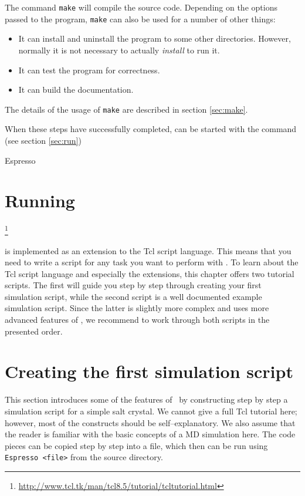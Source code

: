 The command \texttt{make} will compile the source code. Depending on
the options passed to the program, \texttt{make} can also be used for
a number of other things:
\begin{itemize}
\item It can install and uninstall the program to some other
  directories. However, normally it is not necessary to actually
  \textit{install} \es{} to run it.
\item It can test the \es{} program for correctness.
\item It can build the documentation.
\end{itemize}
The details of the usage of \texttt{make} are described in section
\vref{sec:make}.

When these steps have successfully completed, \es{} can be started
with the command (see section \vref{sec:run})
\begin{code}
Espresso
\end{code}

\section{Running \es}

\footnote{\url{http://www.tcl.tk/man/tcl8.5/tutorial/tcltutorial.html}}

\es{} is implemented as an extension to the Tcl script language. This means that you need to write a
script for any task you want to perform with \es. To learn about the Tcl script language and
especially the \es{} extensions, this chapter offers two tutorial scripts. The first will guide you
step by step through creating your first simulation script, while the second script is a well
documented example simulation script. Since the latter is slightly more complex and uses more
advanced features of \es{}, we recommend to work through both scripts in the presented order.

\section{Creating the first simulation script}

This section introduces some of the features of \es\ by
constructing step by step a simulation script for a simple salt crystal.
We cannot give a full Tcl tutorial here; however, most of the constructs
should be self--explanatory. We also assume that the reader is familiar with the
basic concepts of a MD simulation here. The code pieces can be copied step by
step into a file, which then can be run using \verb|Espresso <file>| from the
\es source directory.

